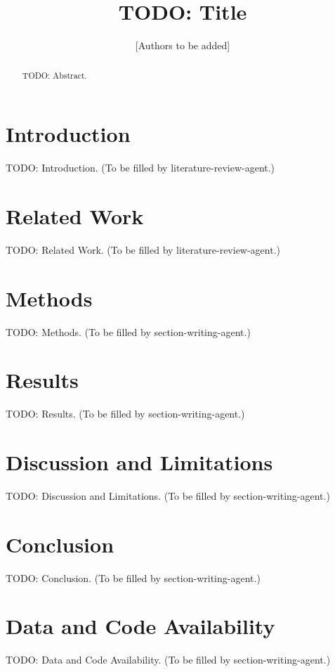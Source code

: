 \documentclass[11pt]{article}
\title{TODO: Title}
\author{[Authors to be added]}
\date{}
\begin{document}
\maketitle

\begin{abstract}
TODO: Abstract.
\end{abstract}

\section{Introduction}
TODO: Introduction. (To be filled by literature-review-agent.)

\section{Related Work}
TODO: Related Work. (To be filled by literature-review-agent.)

\section{Methods}
TODO: Methods. (To be filled by section-writing-agent.)

\section{Results}
TODO: Results. (To be filled by section-writing-agent.)

\section{Discussion and Limitations}
TODO: Discussion and Limitations. (To be filled by section-writing-agent.)

\section{Conclusion}
TODO: Conclusion. (To be filled by section-writing-agent.)

\section*{Data and Code Availability}
TODO: Data and Code Availability. (To be filled by section-writing-agent.)



\end{document}
